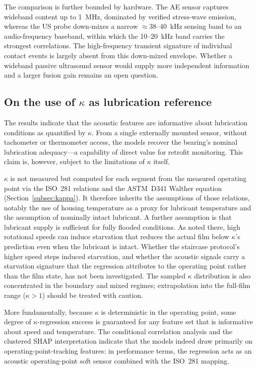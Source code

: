 The comparison is further bounded by hardware. The AE sensor captures wideband
content up to \SI{1}{MHz}, dominated by verified stress-wave emission, whereas
the US probe down-mixes a narrow $\approx$38--40~kHz sensing band to an
audio-frequency baseband, within which the
10--20~kHz band carries the strongest correlations. The high-frequency
transient signature of individual contact events is largely absent from this
down-mixed envelope. Whether a wideband passive ultrasound sensor would supply
more independent information and a larger fusion gain remains an open
question.

\subsection{On the use of $\kappa$ as lubrication reference}
\label{subsec:disc_kappa}
The results indicate that the acoustic features are informative about lubrication conditions as quantified by $\kappa$. From a single externally mounted sensor, without tachometer or thermometer access, the models recover the bearing's nominal lubrication adequacy---a capability of direct value for retrofit monitoring. This claim is, however, subject to the limitations of $\kappa$ itself.

$\kappa$ is not measured but computed for each segment from the measured operating point via the ISO~281 relations and the ASTM~D341 Walther equation (Section~\ref{subsec:kappa}). It therefore inherits the assumptions of those relations, notably the use of housing temperature as a proxy for lubricant temperature and the assumption of nominally intact lubricant. A further assumption is that lubricant supply is sufficient for fully flooded conditions. As noted there, high rotational speeds can induce starvation that reduces the actual film below $\kappa$'s prediction even when the lubricant is intact. Whether the staircase protocol's higher speed steps induced starvation, and whether the acoustic signals carry a starvation signature that the regression attributes to the operating point rather than the film state, has not been investigated. The sampled $\kappa$ distribution is also concentrated in the boundary and mixed regimes; extrapolation into the full-film range ($\kappa > 1$) should be treated with caution.

More fundamentally, because $\kappa$ is deterministic in the operating point, some degree of $\kappa$-regression success is guaranteed for any feature set that is informative about speed and temperature. The conditional correlation analysis and the clustered SHAP interpretation indicate that the models indeed draw primarily on operating-point-tracking features: in performance terms, the regression acts as an acoustic operating-point soft sensor combined with the ISO~281 mapping.


